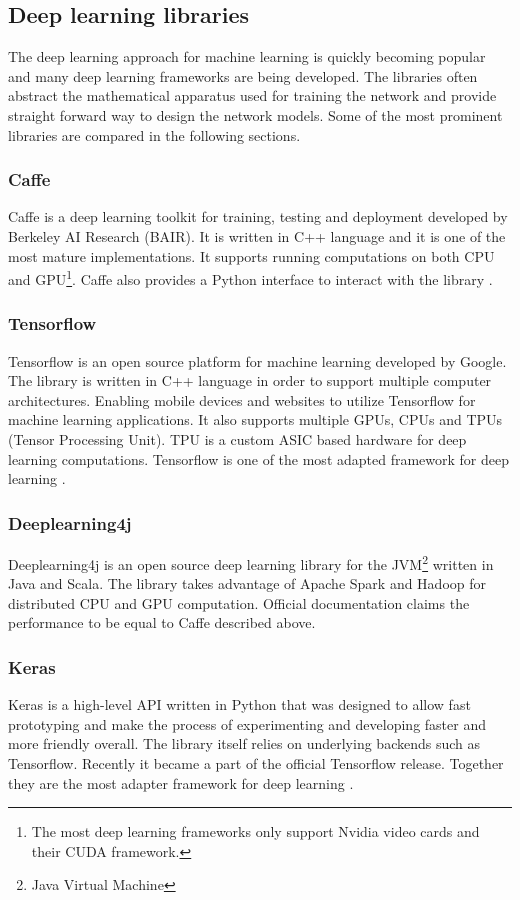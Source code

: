 \documentclass[thesis=M,english]{FITthesis}[2019/03/06]
\begin{document}
\subsection{Deep learning libraries}
The deep learning approach for machine learning is quickly becoming popular and many deep learning frameworks are being developed. The libraries often abstract the mathematical apparatus used for training the network and provide straight forward way to design the network models. Some of the most prominent libraries are compared in the following sections.

\subsubsection{Caffe}
Caffe is a deep learning toolkit for training, testing and deployment developed by Berkeley AI Research (BAIR). It is written in C++ language and it is one of the most mature implementations. It supports running computations on both CPU and GPU\footnote{The most deep learning frameworks only support Nvidia video cards and their CUDA framework.}. Caffe also provides a Python interface to interact with the library \cite{cit:mltoolkits}. 

\subsubsection{Tensorflow}
Tensorflow is an open source platform for machine learning developed by Google. The library is written in C++ language in order to support multiple computer architectures. Enabling mobile devices and websites to utilize Tensorflow for machine learning applications. It also supports multiple GPUs, CPUs and TPUs (Tensor Processing Unit). TPU is a custom ASIC based hardware for deep learning computations. Tensorflow is one of the most adapted framework for deep learning \cite{cit:tensorflow}.

\subsubsection{Deeplearning4j}
Deeplearning4j is an open source deep learning library for the JVM\footnote{Java Virtual Machine} written in Java and Scala. The library takes advantage of Apache Spark and Hadoop for distributed CPU and GPU computation. Official documentation claims the performance to be equal to Caffe described above. 
\subsubsection{Keras}
Keras is a high-level API written in Python that was designed to allow fast prototyping and make the process of experimenting and developing faster and more friendly overall. The library itself relies on underlying backends such as Tensorflow. Recently it became a part of the official Tensorflow release. Together they are the most adapter framework for deep learning \cite{cit:keras}.
\end{document}
